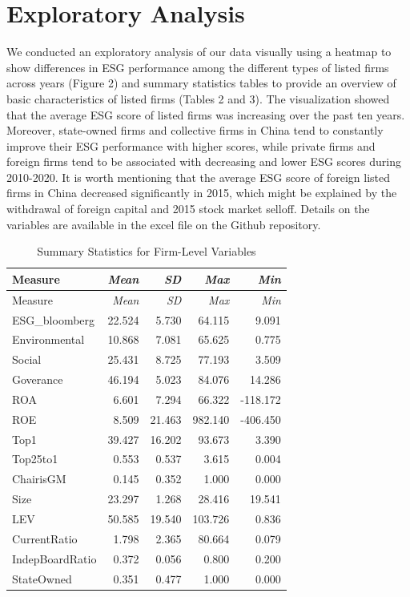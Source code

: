 \documentclass[
  12pt,
]{article}
\begin{document}
\newpage

\hypertarget{exploratory-analysis}{%
\section{Exploratory Analysis}\label{exploratory-analysis}}

We conducted an exploratory analysis of our data visually using a
heatmap to show differences in ESG performance among the different types
of listed firms across years (Figure 2) and summary statistics tables to
provide an overview of basic characteristics of listed firms (Tables 2
and 3). The visualization showed that the average ESG score of listed
firms was increasing over the past ten years. Moreover, state-owned
firms and collective firms in China tend to constantly improve their ESG
performance with higher scores, while private firms and foreign firms
tend to be associated with decreasing and lower ESG scores during
2010-2020. It is worth mentioning that the average ESG score of foreign
listed firms in China decreased significantly in 2015, which might be
explained by the withdrawal of foreign capital and 2015 stock market
selloff. Details on the variables are available in the excel file on the
Github repository.

\begin{longtable}[]{@{}lrrrr@{}}
\caption{Summary Statistics for Firm-Level Variables}\tabularnewline
\toprule
Measure & \emph{Mean} & \emph{SD} & \emph{Max} & \emph{Min} \\
\midrule
\endfirsthead
\toprule
Measure & \emph{Mean} & \emph{SD} & \emph{Max} & \emph{Min} \\
\midrule
\endhead
ESG\_bloomberg & 22.524 & 5.730 & 64.115 & 9.091 \\
Environmental & 10.868 & 7.081 & 65.625 & 0.775 \\
Social & 25.431 & 8.725 & 77.193 & 3.509 \\
Goverance & 46.194 & 5.023 & 84.076 & 14.286 \\
ROA & 6.601 & 7.294 & 66.322 & -118.172 \\
ROE & 8.509 & 21.463 & 982.140 & -406.450 \\
Top1 & 39.427 & 16.202 & 93.673 & 3.390 \\
Top25to1 & 0.553 & 0.537 & 3.615 & 0.004 \\
ChairisGM & 0.145 & 0.352 & 1.000 & 0.000 \\
Size & 23.297 & 1.268 & 28.416 & 19.541 \\
LEV & 50.585 & 19.540 & 103.726 & 0.836 \\
CurrentRatio & 1.798 & 2.365 & 80.664 & 0.079 \\
IndepBoardRatio & 0.372 & 0.056 & 0.800 & 0.200 \\
StateOwned & 0.351 & 0.477 & 1.000 & 0.000 \\
\bottomrule
\end{longtable}
\end{document}

